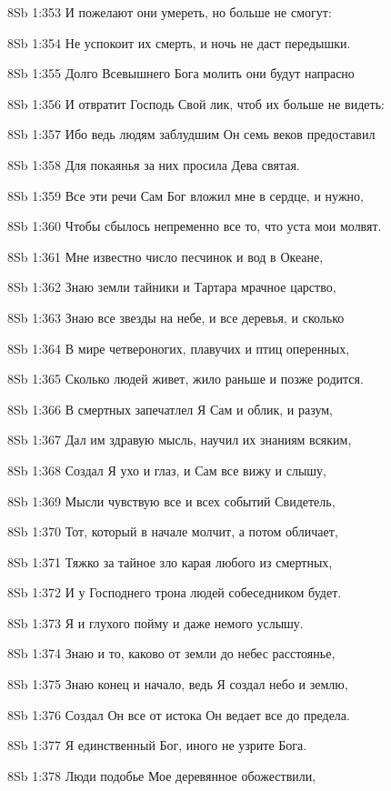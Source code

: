 \vs 8Sb 1:353 И пожелают они умереть, но больше не смогут: 

\vs 8Sb 1:354 Не успокоит их смерть, и ночь не даст передышки.

\vs 8Sb 1:355 Долго Всевышнего Бога молить они будут напрасно  

\vs 8Sb 1:356 И отвратит Господь Свой лик, чтоб их больше не видеть: 

\vs 8Sb 1:357 Ибо ведь людям заблудшим Он семь веков предоставил 

\vs 8Sb 1:358 Для покаянья  за них просила Дева святая.

\vs 8Sb 1:359 Все эти речи Сам Бог вложил мне в сердце, и нужно, 

\vs 8Sb 1:360 Чтобы сбылось непременно все то, что уста мои молвят. 

\vs 8Sb 1:361 Мне известно число песчинок и вод в Океане, 

\vs 8Sb 1:362 Знаю земли тайники и Тартара мрачное царство, 

\vs 8Sb 1:363 Знаю все звезды на небе, и все деревья, и сколько 

\vs 8Sb 1:364 В мире четвероногих, плавучих и птиц оперенных, 

\vs 8Sb 1:365 Сколько людей живет, жило раньше и позже родится.

\vs 8Sb 1:366 В смертных запечатлел Я Сам и облик, и разум, 

\vs 8Sb 1:367 Дал им здравую мысль, научил их знаниям всяким,

\vs 8Sb 1:368 Создал Я ухо и глаз, и Сам все вижу и слышу, 

\vs 8Sb 1:369 Мысли чувствую все и всех событий Свидетель,

\vs 8Sb 1:370 Тот, который в начале молчит, а потом обличает, 

\vs 8Sb 1:371 Тяжко за тайное зло карая любого из смертных, 

\vs 8Sb 1:372 И у Господнего трона людей собеседником будет. 

\vs 8Sb 1:373 Я и глухого пойму и даже немого услышу. 

\vs 8Sb 1:374 Знаю и то, каково от земли до небес расстоянье,

\vs 8Sb 1:375 Знаю конец и начало, ведь Я создал небо и землю, 

\vs 8Sb 1:376 Создал Он все  от истока Он ведает все до предела. 

\vs 8Sb 1:377 Я  единственный Бог, иного не узрите Бога. 

\vs 8Sb 1:378 Люди подобье Мое деревянное обожествили, 

